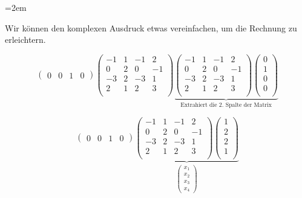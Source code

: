 \begin{solution}    

    \vspace{1\baselineskip}

    \leftskip=2em

    Wir können den komplexen Ausdruck etwas vereinfachen, um die Rechnung zu erleichtern.

    \begin{equation*}    
        \begin{pmatrix}
        0 & 0 & 1 & 0
        \end{pmatrix}
        \begin{pmatrix}
        -1 & 1 & -1 & 2 \\
        0 & 2 & 0 & -1 \\
        -3 & 2 & -3 & 1 \\
        2 & 1 & 2 & 3 \\
        \end{pmatrix}
        \underbrace{
        \begin{pmatrix}
        -1 & 1 & -1 & 2 \\
        0 & 2 & 0 & -1 \\
        -3 & 2 & -3 & 1 \\
        2 & 1 & 2 & 3 \\
        \end{pmatrix}
        \begin{pmatrix}
        0\\
        1\\
        0\\
        0\\
        \end{pmatrix}}_{\text{Extrahiert die 2. Spalte der Matrix}}
    \end{equation*}

    \vspace{1\baselineskip}

    \begin{equation*}    
        \begin{pmatrix}
        0 & 0 & 1 & 0
        \end{pmatrix}
        \underbrace{
        \begin{pmatrix}
        -1 & 1 & -1 & 2 \\
        0 & 2 & 0 & -1 \\
        -3 & 2 & -3 & 1 \\
        2 & 1 & 2 & 3 \\
        \end{pmatrix}
        \begin{pmatrix}
            1 \\
            2 \\
            2 \\ 
            1 \\
        \end{pmatrix}}_{\begin{pmatrix} x_1 \\ x_2 \\ x_3 \\ x_4 \end{pmatrix}}
    \end{equation*}


\end{solution}
